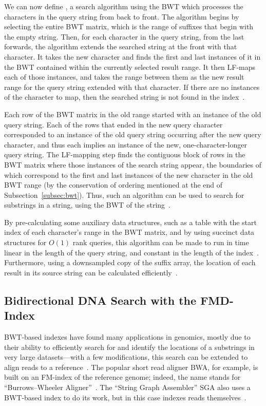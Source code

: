We can now define , a search algorithm using the BWT which processes the characters in the query string from back to front. The algorithm begins by selecting the entire BWT matrix, which is the range of suffixes that begin with the empty string. Then, for each character in the query string, from the last forwards, the algorithm extends the searched string at the front with that character. It takes the new character and finds the first and last instances of it in the BWT contained within the currently selected result range. It then LF-maps each of those instances, and takes the range between them as the new result range for the query string extended with that character. If there are no instances of the character to map, then the searched string is not found in the index~\cite{ferragina2000opportunistic}.

Each row of the BWT matrix in the old range started with an instance of the old query string. Each of the rows that ended in the new query character corresponded to an instance of the old query string occurring after the new query character, and thus each implies an instance of the new, one-character-longer query string. The LF-mapping step finds the contiguous block of rows in the BWT matrix where those instances of the search string appear, the boundaries of which correspond to the first and last instances of the new character in the old BWT range (by the conservation of ordering mentioned at the end of Subsection~\ref{subsec:bwt}). Thus, such an algorithm can be used to search for substrings in a string, using the BWT of the string~\cite{ferragina2000opportunistic}.

By pre-calculating some auxiliary data structures, such as a table with the start index of each character's range in the BWT matrix, and by using succinct data structures for $O(1)$ rank queries, this algorithm can be made to run in time linear in the length of the query string, and constant in the length of the index~\cite{ferragina2000opportunistic}. Furthermore, using a downsampled copy of the suffix array, the location of each result in its source string can be calculated efficiently~\cite{siren2009run}.

\subsection{Bidirectional DNA Search with the FMD-Index}

BWT-based indexes have found many applications in genomics, mostly due to their ability to efficiently search for and identify the locations of a substrings in very large datasets---with a few modifications, this search can be extended to align reads to a reference~\cite{li2014bwa}. The popular short read aligner BWA, for example, is built on an FM-index of the reference genome; indeed, the name stands for ``Burrows--Wheeler Aligner''~\cite{li2014bwa,li2009fast}. The ``String Graph Assembler'' SGA also uses a BWT-based index to do its work, but in this case indexes reads themselves~\cite{simpson2012efficient}.


